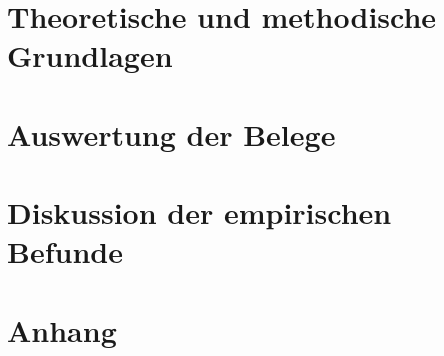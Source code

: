 \documentclass[output=book,
  colorlinks,citecolor=brown,
  draftmode,
  booklanguage=german,
]{langscibook}
\begin{document}

\maketitle
\frontmatter
{\sloppy\tableofcontents}

%  

\mainmatter


\part{Theoretische und methodische Grundlagen}






\part{Auswertung der Belege}




\part{Diskussion der empirischen Befunde}



\appendix
{}
{}
\part*{Anhang}





\end{document}
